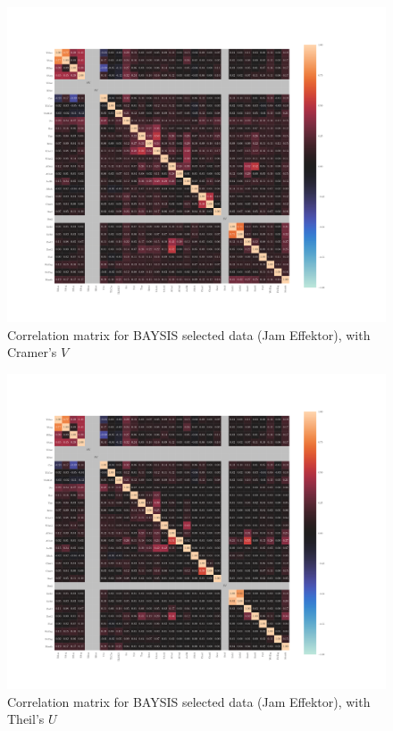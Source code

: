 \documentclass[a4paper,headsepline,footsepline,fontsize=11pt,BCOR=12mm,DIV=12]{report}
\begin{document}
\begin{appendices}
\begin{figure}[h]
	\centering
	\includegraphics[scale=0.52, trim=2cm 2cm 0cm 0cm]{../CorrAnalysis/data/BAYSIS/03_selected_02_duringJam/plots/baysis_selected_corr_cramers}
	\caption{Correlation matrix for BAYSIS selected data (Jam Effektor), with Cramer's $V$}
	\label{img:appendix_correlation_matrix_selected_startJam_cramers}
\end{figure}
\restoregeometry

\label{appendix_baysis_dataset_corr_theils}
\begin{figure}[h]
	\centering
	\includegraphics[scale=0.52, trim=2cm 2cm 0cm 0cm]{../CorrAnalysis/data/BAYSIS/03_selected_02_duringJam/plots/baysis_selected_corr_theils}
	\caption{Correlation matrix for BAYSIS selected data (Jam Effektor), with Theil's $U$}
	\label{img:appendix_correlation_matrix_selected_startJam_theils}
\end{figure}
\restoregeometry


\end{appendices}
\end{document}
